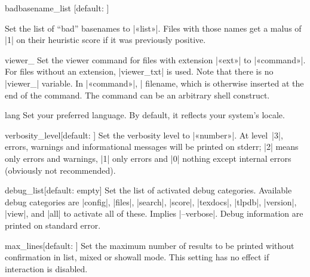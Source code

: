 \documentclass{texdoc-doc}
\begin{document}
\begin{confitem}{badbasename\_list}
  {}[default: ]

Set the list of ``bad'' basenames to |«list»|. Files with those names get a
malus of |1| on their heuristic score if it was previously positive.
\end{confitem}

\begin{confitem}{viewer\_}{}
Set the viewer command for files with extension |«ext»| to |«command»|. For
files without an extension, |viewer_txt| is used. Note that there is no
|viewer_| variable. In |«command»|, |%
filename, which is otherwise inserted at the end of the command. The command
can be an arbitrary shell construct.
\end{confitem}

\begin{confitem}{lang}{}
Set your preferred language. By default, it reflects your system's locale.
\end{confitem}

\begin{confitem}{verbosity\_level}{}[default: ]
Set the verbosity level to |«number»|. At level~|3|, errors, warnings and
informational messages will be printed on stderr; |2| means only errors and
warnings, |1| only errors and |0| nothing except internal errors (obviously not
recommended).
\end{confitem}

\begin{confitem}{debug\_list}{}[default: empty]
Set the list of activated debug categories. Available debug categories are
|config|, |files|, |search|, |score|, |texdocs|, |tlpdb|, |version|, |view|,
and |all| to activate all of these. Implies |--verbose|. Debug information are
printed on standard error.
\end{confitem}

\begin{confitem}{max\_lines}{}[default: ]
Set the maximum number of results to be printed without confirmation in list,
mixed or showall mode. This setting has no effect if interaction is disabled.
\end{confitem}
\end{document}
